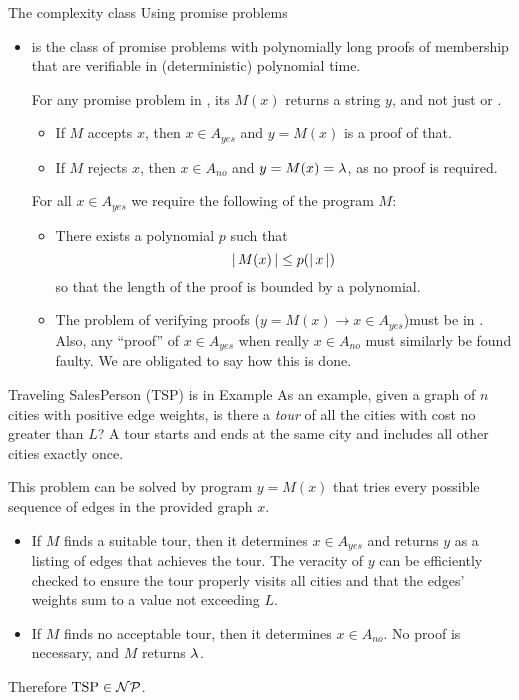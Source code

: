 \begin{frame}{The complexity class }{Using promise problems}

\begin{itemize}
    \item[\CompClass{NP}] is the class of promise problems with polynomially long proofs of membership that are verifiable in (deterministic) polynomial time.   
    
    For any promise problem in , its $M(x)$ returns a string $y$, and not just \True{} or \False{}.
    \begin{itemize}
        \item If $M$ accepts $x$, then $x\in A_{yes}$ and $y=M(x)$ is a proof of that.  
        \item If $M$ rejects $x$, then $x\in A_{no}$ and $y=M(x)=\lambda$, as no proof is required.
    \end{itemize}
    \MedSkip{}
    For all $x \in A_{yes}$ we require the following of the program $M$:
    \begin{itemize}
        \item There exists a polynomial $p$ such that \[|\,M(x)\,| \leq p(|\,x\,|)\]
        so that the length of the proof is bounded by a polynomial.
        \item  The problem of verifying proofs ($y=M(x)\rightarrow x\in A_{yes}$)must be in .  Also, any  ``proof'' of $x\in A_{yes}$ when really $x\in A_{no}$ must similarly be found faulty.
        We are obligated to say how this is done.
    \end{itemize}
    
\end{itemize}
\end{frame}
\begin{frame}{Traveling SalesPerson (TSP) is in }{Example}
As an example, given a graph of $n$ cities with positive edge weights, is there a \emph{tour} of all the cities with cost no greater than $L$?  A tour starts and ends at the same city and includes all other cities exactly once.

This problem can be solved by program $y=M(x)$ that tries every possible sequence of edges in the provided graph $x$.
\begin{itemize}
    \item If $M$ finds a suitable tour, then it determines $x\in A_{yes}$ and returns $y$ as a listing of edges that achieves the tour.  The veracity of $y$ can be efficiently checked to ensure the tour properly visits all cities and that the edges' weights sum to a value not exceeding $L$.
    \item If $M$ finds no acceptable tour, then it determines $x \in A_{no}$.  No proof is necessary, and $M$ returns $\lambda{}$.
\end{itemize}
Therefore $\mbox{TSP}\in \mathcal{NP}$.
    
\end{frame}